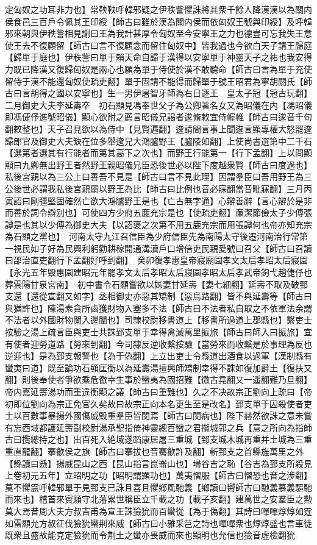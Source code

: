 定匈奴之功耳非力也】常鞅鞅呼韓邪疑之伊秩訾懼誅將其衆千餘人降漢漢以為關内侯食邑三百戶令佩其王印綬【師古曰雖於漢為關内侯而依匈奴王號與印綬】及呼韓邪來朝與伊秩訾相見謝曰王為我計甚厚令匈奴至今安寧王之力也德豈可忘我失王意使王去不復顧留【師古曰言不復顧念而留住匈奴中】皆我過也今欲白天子請王歸庭【歸單于庭也】伊秩訾曰單于賴天命自歸于漢得以安寧單于神靈天子之祐也我安得力既已降漢又復歸匈奴是兩心也願為單于侍使於漢不敢聽命【師古曰言為單于充使留侍于漢不能還匈奴使疏吏翻】單于固請不能得而歸單于號王昭君為寧胡閼氏【師古曰言胡得之國以安寧也】生一男伊屠智牙師為右日逐王　皇太子冠【冠古玩翻】　二月御史大夫李延夀卒　初石顯見馮奉世父子為公卿著名女又為昭儀在内【馮昭儀即馮倢伃進號昭儀】顯心欲附之薦言昭儀兄謁者逡脩敕宜侍幄帷【師古曰逡音千句翻敕整也】天子召見欲以為侍中【見賢遍翻】逡請間言事上聞逡言顯專權大怒罷逡歸郎官及御史大夫缺在位多舉逡兄大鴻臚野王【臚陵如翻】上使尚書選第中二千石【選第者選其有行能者而第其高下之次也】而野王行能第一【行下孟翻】上以問顯顯曰九卿無出野王者然野王親昭儀兄臣恐後世必以陛下度越衆賢【師古曰度過也】私後宮親以為三公上曰善吾不見是【師古曰言不見此理】因謂羣臣曰吾用野王為三公後世必謂我私後宮親屬以野王為比【師古曰比例也音必寐翻當音毗寐翻】三月丙寅詔曰剛彊堅固確然亡欲大鴻臚野王是也【亡古無字通】心辯善辭【言心辯於是非而善於詞令辯别也】可使四方少府五鹿充宗是也【使疏吏翻】亷潔節儉太子少傅張譚是也其以少傅為御史大夫【以詔褒之次第不用五鹿充宗而用張譚何也帝亦知充宗為石顯之黨也】　河南太守九江召信臣為少府信臣先為南陽太守後遷河南治行常第一視民如子好為民興利躬勸耕稼開通溝瀆戶口增倍吏民親愛號曰召父【師古曰召讀曰邵治直吏翻行下孟翻好呼到翻】　癸卯復孝惠皇帝寢廟園孝文太后孝昭太后寢園【永光五年毁惠園建昭元年罷孝文太后孝昭太后寢園孝昭太后孝武帝鉤弋趙倢伃也葬雲陽甘泉宮南】　初中書令石顯嘗欲以姊妻甘延壽【妻七細翻】延壽不取及破郅支還【還從宣翻又如字】丞相御史亦惡其矯制【惡烏路翻】皆不與延壽等【師古曰與猶許也】陳湯素貪所鹵獲財物入塞多不法【師古曰不法者私自取之不依軍法余謂不法者以外國財物闌入邊闈也】司隸校尉移書道上【移書所過道上郡縣也】繫吏士按驗之湯上疏言臣與吏士共誅郅支單于幸得禽滅萬里振旅【師古曰師入曰振旅】宜有使者迎勞道路【勞來到翻】今司隸反逆收繫按驗【當勞來而收繫是於事理為反也逆迎也】是為郅支報讐也【為于偽翻】上立出吏士令縣道出酒食以過軍【漢制縣有蠻夷曰道】既至論功石顯匡衡以為延壽湯擅興師矯制幸得不誅如復加爵土【復扶又翻】則後奉使者爭欲乘危徼幸生事於蠻夷為國招難【徼古堯翻又一遥翻難乃旦翻】帝内嘉延壽湯功而重違衡顯之議【師古曰重難也】久之不决故宗正劉向上疏曰【帝初即位劉向為宗正免官久矣故曰故宗正向本名更生至是改名】郅支單于囚殺使者吏士以百數事暴揚外國傷威毁重羣臣皆閔焉【師古曰閔病也】陛下赫然欲誅之意未嘗有忘西域都護延壽副校尉湯承聖指倚神靈總百蠻之君攬城郭之兵【意之所向為指師古曰攬總持之也】出百死入絶域遂蹈康居屠三重城【郅支城木城再重并土城為三重重直龍翻】搴歙侯之旗【師古曰搴拔也音騫歙許及翻】斬郅支之首縣旌萬里之外【縣讀曰懸】揚威昆山之西【昆山指言崑崙山也】埽谷吉之恥【谷吉為郅支所殺見上卷初元五年】立昭明之功【昭明謂顯功也】萬夷慴服【師古曰慴恐也音之涉翻】莫不懼震呼韓邪單于見郅支已誅且喜且懼鄉風馳義【鄉讀曰嚮師古曰馳義慕義驅馳而來也】稽首來賓願守北藩累世稱臣立千載之功【載子亥翻】建萬世之安羣臣之勲莫大焉昔周大夫方叔吉甫為宣王誅獫狁而百蠻從【為于偽翻】其詩曰嘽嘽焞焞如霆如雷顯允方叔征伐獫狁蠻荆來威【師古曰小雅采芑之詩也嘽嘽衆也焞焞盛也言車徒既衆且盛故能克定獫狁而令荆土之蠻亦畏威而來也顯明也允信也獫音虚檢翻狁